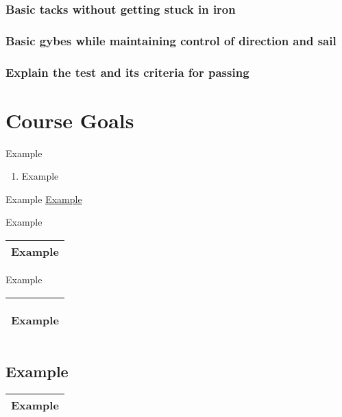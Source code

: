 \documentclass[12pt]{scrartcl}
\begin{document}
\subsubsection{Basic tacks without getting stuck in iron} \label{subsubsec:tacks}

\subsubsection{Basic gybes while maintaining control of direction and sail} \label{subsubsec:gybe}

\subsubsection{Explain the test and its criteria for passing} \label{subsubsec:test}

\begin{comment}
	Syllabus --- special note setup for teaching tips
		setup
		on water
		packup
		debrief
		packup
	Test --- with checkboxes and final tabulation
	Diagrams & Teaching Aids --- on individual pages for ease of printing
		points of sail
		course
		handouts

\end{comment}

\section{Course Goals} \label{sec:goals}

Example

\begin{enumerate}
	\item Example
\end{enumerate}

Example \hyperlink{example:example}{Example}

\newpage

\begin{landscape}

	Example

	\begin{center}
		\scriptsize{
			\begin{tabularx}{520pt}{|X|}
				\hline
				Example \\
				\hline
			\end{tabularx}
		}
	\end{center}

	Example

\end{landscape}

\newpage

\begin{tabularx}{\textwidth}{|X|}

	\hline
	\hypertarget{example:example}{Example} \\
	\hline

\end{tabularx}

\subsection{Example} \label{subsec:example}

\begin{tabular}{|l|}
	\hline
	Example \\
	\hline
\end{tabular}

\end{document}
